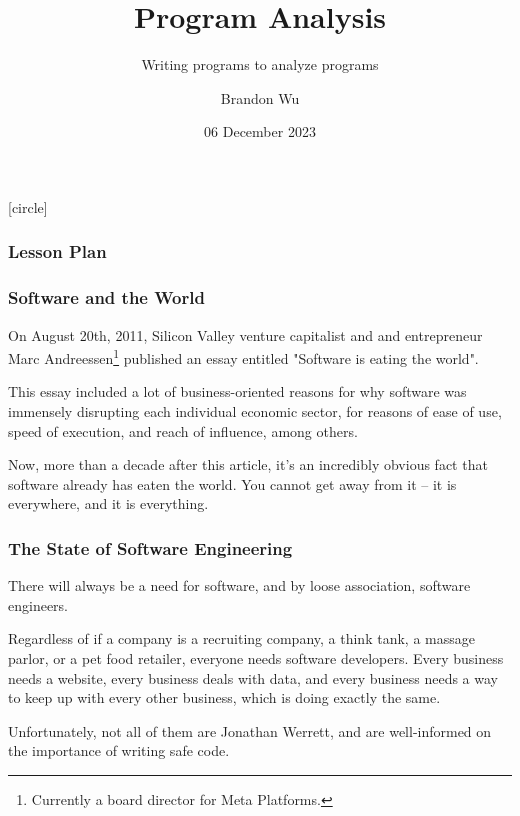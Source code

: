\documentclass[aspectratio=169, handout]{beamer}
\title{Program Analysis} %
\subtitle{Writing programs to analyze programs} %
\date{06 December 2023} %
\author{Brandon Wu} %
\newif\ifcolorlambda
\begin{document}
\ifweb
    \renewcommand{\pause}{}
\fi

[circle]

{
\begin{frame}[plain]
    \colorlambdatrue
    \titlepage
\end{frame}
}

\begin{frame}[fragile]
  \frametitle{Lesson Plan}

  \tableofcontents
\end{frame}


\begin{frame}[fragile]
  \frametitle{Software and the World}

  On August 20th, 2011, Silicon Valley venture capitalist and and
  entrepreneur Marc Andreessen\footnote{Currently a board director for Meta Platforms.} published an essay entitled
  "Software is eating the world".

  \pause
  \vspace{\fill}

  This essay included a lot of business-oriented reasons for why software
  was immensely disrupting each individual economic sector, for reasons of
  ease of use, speed of execution, and reach of influence, among others.

  \pause
  \vspace{\fill}

  Now, more than a decade after this article, it's an incredibly obvious fact that
  software already has eaten the world. You cannot get away from it -- it is
  everywhere, and it is everything.
\end{frame}

\begin{frame}[fragile]
  \frametitle{The State of Software Engineering}

  There will always be a need for software, and by loose association, software engineers.

  \pause
  \vspace{\fill}

  Regardless of if a company is a recruiting company, a think tank, a massage parlor,
  or a pet food retailer, everyone needs software developers. Every business needs
  a website, every business deals with data, and every business needs a way to
  keep up with every other business, which is doing exactly the same.

  \pause
  \vspace{\fill}

  Unfortunately, not all of them are Jonathan Werrett, and are well-informed on
  the importance of writing safe code.
\end{frame}
\end{document}
